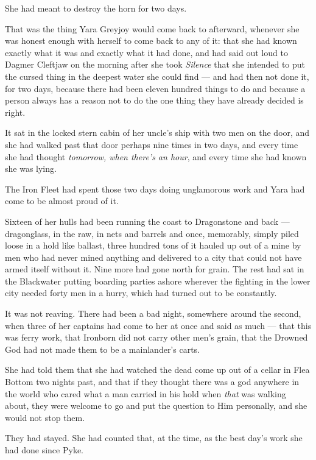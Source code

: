 She had meant to destroy the horn for two days.

That was the thing Yara Greyjoy would come back to afterward, whenever she was honest enough with herself to come back to any of it: that she had known exactly what it was and exactly what it had done, and had said out loud to Dagmer Cleftjaw on the morning after she took \textit{Silence} that she intended to put the cursed thing in the deepest water she could find — and had then not done it, for two days, because there had been eleven hundred things to do and because a person always has a reason not to do the one thing they have already decided is right.

It sat in the locked stern cabin of her uncle’s ship with two men on the door, and she had walked past that door perhaps nine times in two days, and every time she had thought \textit{tomorrow, when there’s an hour}, and every time she had known she was lying.

\sceneBreak

The Iron Fleet had spent those two days doing unglamorous work and Yara had come to be almost proud of it.

Sixteen of her hulls had been running the coast to Dragonstone and back — dragonglass, in the raw, in nets and barrels and once, memorably, simply piled loose in a hold like ballast, three hundred tons of it hauled up out of a mine by men who had never mined anything and delivered to a city that could not have armed itself without it. Nine more had gone north for grain. The rest had sat in the Blackwater putting boarding parties ashore wherever the fighting in the lower city needed forty men in a hurry, which had turned out to be constantly.

It was not reaving. There had been a bad night, somewhere around the second, when three of her captains had come to her at once and said as much — that this was ferry work, that Ironborn did not carry other men’s grain, that the Drowned God had not made them to be a mainlander’s carts.

She had told them that she had watched the dead come up out of a cellar in Flea Bottom two nights past, and that if they thought there was a god anywhere in the world who cared what a man carried in his hold when \textit{that} was walking about, they were welcome to go and put the question to Him personally, and she would not stop them.

They had stayed. She had counted that, at the time, as the best day’s work she had done since Pyke.

